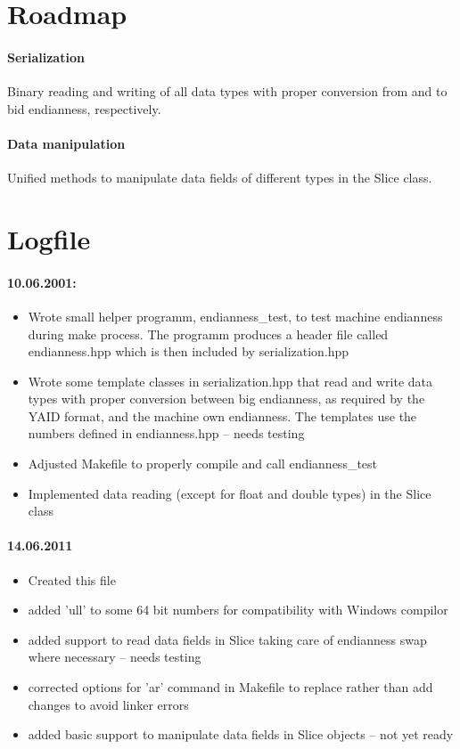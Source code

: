 \documentclass[a4paper,11pt]{article}
\begin{document}
%
\section{Roadmap}
%
\paragraph{Serialization}
Binary reading and writing of all data types with proper conversion from and to bid endianness, respectively.
%
\paragraph{Data manipulation}
Unified methods to manipulate data fields of different types in the Slice class.


%
%
\section{Logfile}
%
%
\paragraph{10.06.2001:}
\begin{itemize}
%
\item{Wrote small helper programm, endianness\_test, 
to test machine endianness during make process. The programm produces a header
file called endianness.hpp which is then included by serialization.hpp}
%
\item{Wrote some template classes in serialization.hpp that read and write data types with proper conversion between
big endianness, as required by the YAID format, and the machine own endianness. The templates use the numbers defined
in endianness.hpp  -- needs testing}
%
\item{Adjusted Makefile to properly compile and call endianness\_test}
%
\item{Implemented data reading (except for float and double types) in the Slice class}
%
\end{itemize}
%
%
\paragraph{14.06.2011}
%
\begin{itemize}
%
\item{Created this file}
%
\item{added 'ull' to some 64 bit numbers for compatibility with Windows compilor}
%
\item{added support to read data fields in Slice taking care of endianness swap where necessary -- needs testing}
%
\item{corrected options for 'ar' command in Makefile to replace rather than add changes to avoid linker errors}
%
\item{added basic support to manipulate data fields in Slice objects -- not yet ready}
\end{itemize}
%
%
\end{document}
